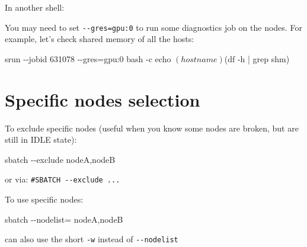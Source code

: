 \documentclass[
]{report}
\newenvironment{Shaded}{\begin{snugshade}}{\end{snugshade}}
\newcommand{\AttributeTok}[1]{\textcolor[rgb]{0.40,0.45,0.13}{#1}}
\newcommand{\BuiltInTok}[1]{\textcolor[rgb]{0.00,0.23,0.31}{#1}}
\newcommand{\ExtensionTok}[1]{\textcolor[rgb]{0.00,0.23,0.31}{#1}}
\newcommand{\NormalTok}[1]{\textcolor[rgb]{0.00,0.23,0.31}{#1}}
\newcommand{\OperatorTok}[1]{\textcolor[rgb]{0.37,0.37,0.37}{#1}}
\newcommand{\StringTok}[1]{\textcolor[rgb]{0.13,0.47,0.30}{#1}}
\newcommand{\VariableTok}[1]{\textcolor[rgb]{0.07,0.07,0.07}{#1}}
\begin{document}
In another shell:

\begin{Shaded}
\end{Shaded}

You may need to set \texttt{-\/-gres=gpu:0} to run some diagnostics job
on the nodes. For example, let's check shared memory of all the hosts:

\begin{Shaded}
\begin{Highlighting}[]
\ExtensionTok{srun} \AttributeTok{{-}{-}jobid}\NormalTok{ 631078 }\AttributeTok{{-}{-}gres}\OperatorTok{=}\NormalTok{gpu:0 bash }\AttributeTok{{-}c} \StringTok{\textquotesingle{}echo $(hostname) $(df {-}h | grep shm)\textquotesingle{}}
\end{Highlighting}
\end{Shaded}

\section{Specific nodes selection}\label{specific-nodes-selection}

To exclude specific nodes (useful when you know some nodes are broken,
but are still in IDLE state):

\begin{Shaded}
\begin{Highlighting}[]
\ExtensionTok{sbatch} \AttributeTok{{-}{-}exclude}\NormalTok{ nodeA,nodeB}
\end{Highlighting}
\end{Shaded}

or via: \texttt{\#SBATCH\ -\/-exclude\ ...}

To use specific nodes:

\begin{Shaded}
\begin{Highlighting}[]
\ExtensionTok{sbatch} \AttributeTok{{-}{-}nodelist}\OperatorTok{=}\NormalTok{ nodeA,nodeB}
\end{Highlighting}
\end{Shaded}

can also use the short \texttt{-w} instead of \texttt{-\/-nodelist}
\end{document}
